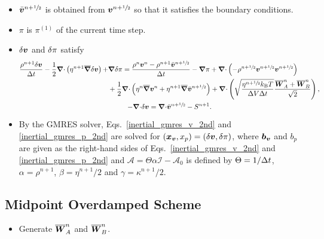 \documentclass[
10pt
showpacs, showkeys,
amsmath,amssymb,
aps,
pre,
floatfix,
]{revtex4-1}
\newcommand{\divg}{{\V\nabla\cdot}}                       %
\newcommand{\paren}[1]{{(#1)}}                            %
\begin{document}
\begin{enumerate}
\begin{itemize}
\item $\bar{\boldsymbol{v}}^{n+\sfrac{1}{2}}$ is obtained from $\boldsymbol{v}^{n+\sfrac{1}{2}}$ so that it satisfies the boundary conditions.
\item $\pi$ is $\pi^\paren{1}$ of the current time step.
\item $\delta\boldsymbol{v}$ and $\delta\pi$ satisfy
\begin{gather}
\label{inertial_gmres_v_2nd}
\begin{split}
\frac{\rho^{n+1}\d{\V{v}}}{\D{t}} - \frac{1}{2}\divg\left(\eta^{n+1}\overline{\grad}\d{\V{v}}\right) + & \grad\d{\pi}
= \frac{\rho^n\V{v}^n-\rho^{n+1}\bar{\V{v}}^{n+\myhalf}}{\D{t}} - \grad\pi 
+ \divg\left(-\rho^{n+\myhalf}\V{v}^{n+\myhalf}\V{v}^{n+\myhalf}\right) \\
& + \frac{1}{2}\divg\left( \eta^n \overline{\grad}\V{v}^n + \eta^{n+1} \overline{\grad}\bar{\V{v}}^{n+\myhalf} \right)
+ \divg\left( \sqrt{\frac{\eta^{n+\myhalf} k_\mathrm{B}T}{\D{V}\D{t}} } \frac{\overline{\V{W}}^n_A + \overline{\V{W}}^n_B}{\sqrt{2}} \right),
\end{split} \\
\label{inertial_gmres_p_2nd}
-\divg\d{\V{v}} = \divg\bar{\V{v}}^{n+\myhalf}-S^{n+1}.
\end{gather}
\item By the GMRES solver, Eqs.~\eqref{inertial_gmres_v_2nd} and \eqref{inertial_gmres_p_2nd} are solved for $(\boldsymbol{x}_{\boldsymbol{v}},x_p)=(\delta\boldsymbol{v},\delta\pi)$, where $\boldsymbol{b}_{\boldsymbol{v}}$ and $b_p$ are given as the right-hand sides of Eqs.~\eqref{inertial_gmres_v_2nd} and \eqref{inertial_gmres_p_2nd} and $\mathcal{A}=\Theta\alpha\mathcal{I}-\mathcal{A}_0$ is defined by $\Theta=1/\Delta t$, $\alpha=\rho^{n+1}$, $\beta=\eta^{n+1}/2$ and $\gamma=\kappa^{n+1}/2$.
\end{itemize}

\end{enumerate}



\clearpage



\subsection{Midpoint Overdamped Scheme}

\begin{itemize}
\item Generate $\overline{\boldsymbol{W}}^n_A$ and $\overline{\boldsymbol{W}}^n_B$.
\end{itemize}
\end{document}
